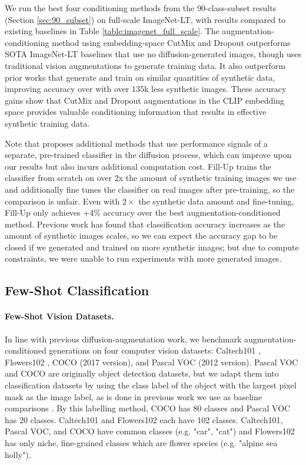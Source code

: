 We run the best four conditioning methods from the 90-class-subset results (Section \ref{sec:90_subset}) on full-scale ImageNet-LT, with results compared to existing baselines in Table \ref{table:imagenet_full_scale}.
The augmentation-conditioning method using embedding-space CutMix and Dropout outperforms SOTA ImageNet-LT baselines that use no diffusion-generated images, though \citep{best_non_synthetic_imagenetlt} uses traditional vision augmentations to generate training data. 
It also outperform prior works that generate and train on similar quantities of synthetic data, improving accuracy over \citep{feedbackguided} with over 135k less synthetic images. 
These accuracy gains show that CutMix and Dropout augmentations in the CLIP embedding space provides valuable conditioning information that results in effective synthetic training data. 

Note that \cite{feedbackguided} proposes additional methods that use performance signals of a separate, pre-trained classifier in the diffusion process, which can improve upon our results but also incurs additional computation cost. 
Fill-Up \citep{fill-up-lt} trains the classifier from scratch on over 2x the amount of synthetic training images we use and additionally fine tunes the classifier on real images after pre-training, so the comparison is unfair. 
Even with $2\times$ the synthetic data amount and fine-tuning, Fill-Up only achieves +4\% accuracy over the best augmentation-conditioned method. 
Previous work \citep{syntheticscaling} has found that classification accuracy increases as the amount of synthetic images scales, so we can expect the accuracy gap to be closed if we generated and trained on more synthetic images; but due to compute constraints, we were unable to run experiments with more generated images.


\subsection{Few-Shot Classification} \label{sec:few_shot}
\vspace{-0.15cm}

\paragraph{Few-Shot Vision Datasets.}
In line with previous diffusion-augmentation work, we benchmark augmentation-conditioned generations on four computer vision datasets: Caltech101 \citep{caltech101}, Flowers102 \citep{flowers102}, COCO \citep{COCO} (2017 version), and Pascal VOC \citep{pascal} (2012 version). 
Pascal VOC and COCO are originally object detection datasets, but we adapt them into classification datasets by using the class label of the object with the largest pixel mask as the image label, as is done in previous work we use as baseline comparisons \citep{da-fusion}. 
By this labelling method, COCO has 80 classes and Pascal VOC has 20 classes. Caltech101 and Flowers102 each have 102 classes. 
Caltech101, Pascal VOC, and COCO have common classes (e.g. "car", "cat") and Flowers102 has only niche, fine-grained classes which are flower species (e.g. "alpine sea holly").

